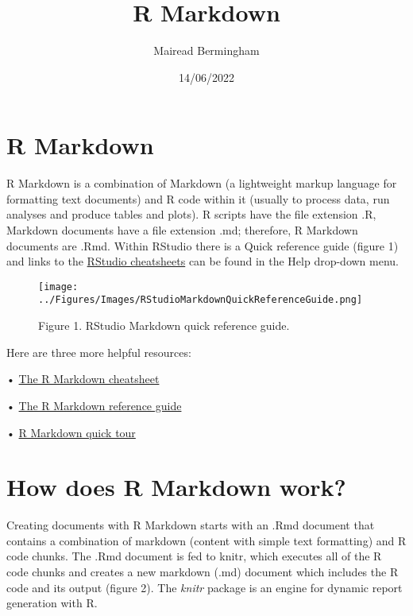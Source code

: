 \documentclass[
]{article}
\title{R Markdown}
\author{Mairead Bermingham}
\date{14/06/2022}
\begin{document}
\maketitle

\hypertarget{r-markdown}{%
\section{\texorpdfstring{\textbf{R
Markdown}}{R Markdown}}\label{r-markdown}}

R Markdown is a combination of Markdown (a lightweight markup language
for formatting text documents) and R code within it (usually to process
data, run analyses and produce tables and plots). R scripts have the
file extension .R, Markdown documents have a file extension .md;
therefore, R Markdown documents are .Rmd. Within RStudio there is a
Quick reference guide (figure 1) and links to the
\href{https://eu01.alma.exlibrisgroup.com/leganto/public/44UOE_INST/citation/37711420600002466?auth=SAML}{RStudio
cheatsheets} can be found in the Help drop-down menu.

\begin{figure}
\centering
\texttt{[image: ../Figures/Images/RStudioMarkdownQuickReferenceGuide.png]}
\caption{Figure 1. RStudio Markdown quick reference guide.}
\end{figure}

Here are three more helpful resources:

•
\href{https://eu01.alma.exlibrisgroup.com/leganto/public/44UOE_INST/citation/37711403400002466?auth=SAML}{The
R Markdown cheatsheet}

•
\href{https://eu01.alma.exlibrisgroup.com/leganto/public/44UOE_INST/citation/37711415410002466?auth=SAML}{The
R Markdown reference guide}

•
\href{https://eu01.alma.exlibrisgroup.com/leganto/public/44UOE_INST/citation/37711529450002466?auth=SAML}{R
Markdown quick tour}

\hypertarget{how-does-r-markdown-work}{%
\section{\texorpdfstring{\textbf{How does R Markdown
work?}}{How does R Markdown work?}}\label{how-does-r-markdown-work}}

Creating documents with R Markdown starts with an .Rmd document that
contains a combination of markdown (content with simple text formatting)
and R code chunks. The .Rmd document is fed to knitr, which executes all
of the R code chunks and creates a new markdown (.md) document which
includes the R code and its output (figure 2). The \emph{knitr} package
is an engine for dynamic report generation with R.
\end{document}
